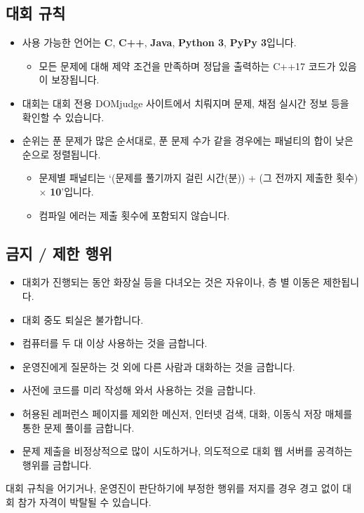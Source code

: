 \subsection*{대회 규칙}
\begin{itemize}
    \item 사용 가능한 언어는 \textbf{C}, \textbf{C++}, \textbf{Java}, \textbf{Python 3}, \textbf{PyPy 3}입니다.
    \begin{itemize}
        \item 모든 문제에 대해 제약 조건을 만족하며 정답을 출력하는 C++17 코드가 있음이 보장됩니다.
    \end{itemize}
    \item 대회는 대회 전용 DOMjudge 사이트에서 치뤄지며 문제, 채점 실시간 정보 등을 확인할 수 있습니다.
    \item 순위는 푼 문제가 많은 순서대로, 푼 문제 수가 같을 경우에는 패널티의 합이 낮은 순으로 정렬됩니다.
    \begin{itemize}
        \item 문제별 패널티는 `(문제를 풀기까지 걸린 시간(분)) + (그 전까지 제출한 횟수) $ \times $ \textbf{10}'입니다.
        \item 컴파일 에러는 제출 횟수에 포함되지 않습니다.
    \end{itemize}
\end{itemize}
\subsection*{금지 / 제한 행위}
\begin{itemize}
    \item 대회가 진행되는 동안 화장실 등을 다녀오는 것은 자유이나, 층 별 이동은 제한됩니다.
    \item 대회 중도 퇴실은 불가합니다.
    \item 컴퓨터를 두 대 이상 사용하는 것을 금합니다.
    \item 운영진에게 질문하는 것 외에 다른 사람과 대화하는 것을 금합니다.
    \item 사전에 코드를 미리 작성해 와서 사용하는 것을 금합니다.
    \item 허용된 레퍼런스 페이지를 제외한 메신저, 인터넷 검색, 대화, 이동식 저장 매체를 통한 문제 풀이를 금합니다.
    \item 문제 제출을 비정상적으로 많이 시도하거나, 의도적으로 대회 웹 서버를 공격하는 행위를 금합니다.
\end{itemize}
대회 규칙을 어기거나, 운영진이 판단하기에 부정한 행위를 저지를 경우 경고 없이 대회 참가 자격이 박탈될 수 있습니다.
